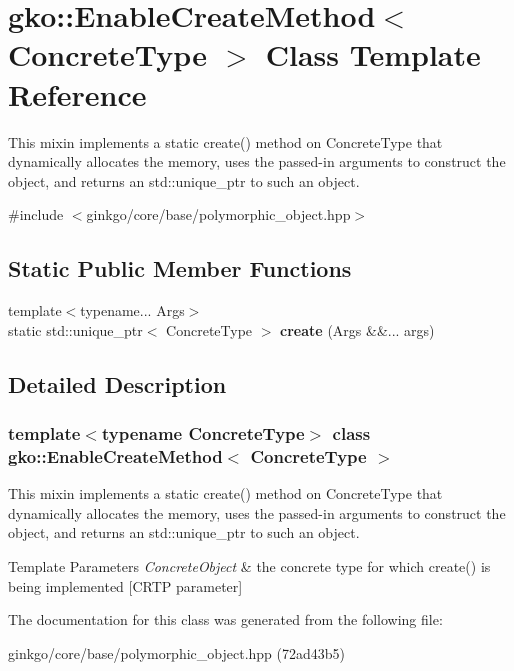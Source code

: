 \hypertarget{classgko_1_1EnableCreateMethod}{}\section{gko\+:\+:Enable\+Create\+Method$<$ Concrete\+Type $>$ Class Template Reference}
\label{classgko_1_1EnableCreateMethod}


This mixin implements a static {\ttfamily create()} method on {\ttfamily Concrete\+Type} that dynamically allocates the memory, uses the passed-\/in arguments to construct the object, and returns an std\+::unique\+\_\+ptr to such an object.  




{\ttfamily \#include $<$ginkgo/core/base/polymorphic\+\_\+object.\+hpp$>$}

\subsection*{Static Public Member Functions}
\begin{DoxyCompactItemize}
\item 
\mbox{\label{classgko_1_1EnableCreateMethod_aa732d4d8736a4ade9206b9641cd1edd5}} 
{\footnotesize template$<$typename... Args$>$ }\\static std\+::unique\+\_\+ptr$<$ Concrete\+Type $>$ {\bfseries create} (Args \&\&... args)
\end{DoxyCompactItemize}


\subsection{Detailed Description}
\subsubsection*{template$<$typename Concrete\+Type$>$\newline
class gko\+::\+Enable\+Create\+Method$<$ Concrete\+Type $>$}

This mixin implements a static {\ttfamily create()} method on {\ttfamily Concrete\+Type} that dynamically allocates the memory, uses the passed-\/in arguments to construct the object, and returns an std\+::unique\+\_\+ptr to such an object. 


\begin{DoxyTemplParams}{Template Parameters}
{\em Concrete\+Object} & the concrete type for which {\ttfamily create()} is being implemented \mbox{[}C\+R\+TP parameter\mbox{]} \\
\hline
\end{DoxyTemplParams}


The documentation for this class was generated from the following file\+:\begin{DoxyCompactItemize}
\item 
ginkgo/core/base/polymorphic\+\_\+object.\+hpp (72ad43b5)\end{DoxyCompactItemize}
